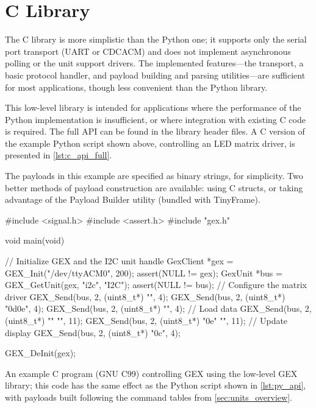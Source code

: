 \section{C Library}

The C library is more simplistic than the Python one; it supports only the serial port transport (\gls{UART} or \gls{CDCACM}) and does not implement asynchronous polling or the unit support drivers. The implemented features---the transport, a basic protocol handler, and payload building and parsing utilities---are sufficient for most applications, though less convenient than the Python library.

This low-level library is intended for applications where the performance of the Python implementation is insufficient, or where integration with existing C code is required. The full \gls{API} can be found in the library header files. A C version of the example Python script shown above, controlling an \gls{LED} matrix driver, is presented in \cref{lst:c_api_full}. 

The payloads in this example are specified as binary strings, for simplicity. Two better methods of payload construction are available: using C structs, or taking advantage of the Payload Builder utility (bundled with TinyFrame).

\begin{listing}
	\begin{ccode}
	#include <signal.h>
	#include <assert.h>
	#include "gex.h"
			
	void main(void)
	{
	    // Initialize GEX and the I2C unit handle
	    GexClient *gex = GEX_Init("/dev/ttyACM0", 200);
	    assert(NULL != gex);        
	    GexUnit *bus = GEX_GetUnit(gex, "i2c", "I2C");
	    assert(NULL != bus);	    	    
	    // Configure the matrix driver
	    GEX_Send(bus, 2, (uint8_t*) "\x00", 4);
	    GEX_Send(bus, 2, (uint8_t*) "\x0d\x0e", 4);
	    GEX_Send(bus, 2, (uint8_t*) "", 4);	    
	    // Load data
	    GEX_Send(bus, 2, (uint8_t*) ""
	                                "\xAA{}\xAA{}\xAA{}\xAA{}", 11);
	    GEX_Send(bus, 2, (uint8_t*) "\x0e"
	                                "\xFF{}\xFF{}\xFF{}\xFF{}", 11);
	    // Update display
	    GEX_Send(bus, 2, (uint8_t*) "\x0c", 4);
	    	    
	    GEX_DeInit(gex);
	}    
	\end{ccode}
	\caption{\label{lst:c_api_full} An example C program (GNU C99) controlling GEX using the low-level GEX library; this code has the same effect as the Python script shown in \cref{lst:py_api}, with payloads built following the command tables from \cref{sec:units_overview}.}
\end{listing}

